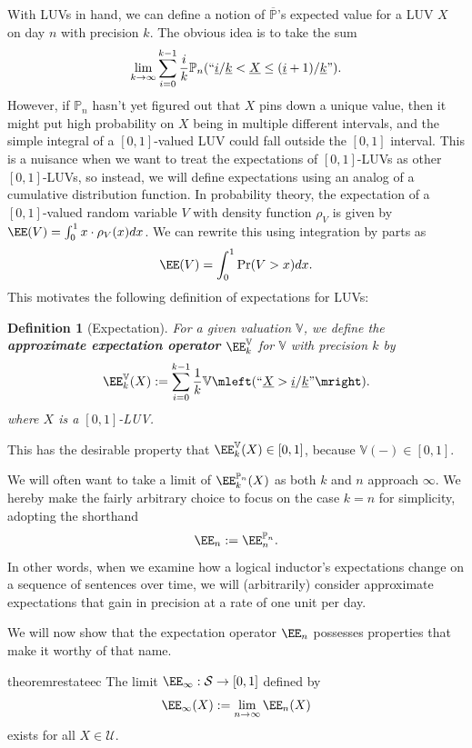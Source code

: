\documentclass[authordate,onecolumn,noenvironments]{miri-tech-article}
\newtheorem{definition}[theorem]{Definition}
\numberwithin{equation}{subsection}
\newcommand{\quot}[1]{``#1"}
\newcommand{\enc}[1]{{\underline{#1}}}
\newcommand{\seq}[1]{{\overline{#1}}}
\newcommand{\any}{-}
\newcommand{\LUVs}{\mathcal{U}}%
\newcommand{\nn}{n}
\newcommand{\rparenthetical}[1]{\hfill\upshape{{\small (#1)}}} %
\newcommand{\proofin}[1]{\rparenthetical{Proof in:~#1.}}
\newcommand{\Bayesian}{\mathrm{Pr}}
\newcommand{\BelState}{\mathbb{P}}
\newcommand{\Valuation}{\mathbb{V}}
\newcommand{\pt}{\BelState}
\newcommand{\MP}{\seq{\pt}}
\newcommand{\Sentences}{\mathcal{S}}
\begin{document}
With LUVs in hand, we can define a notion of $\MP$'s expected value for a LUV $X$ on day $\nn$ with precision $k$. The obvious idea is to take the sum
\[
  \lim_{k \to\infty} \sum_{i=0}^{k-1} \frac{i}{k} \pt_\nn\mleft(
    \quot{\enc{i}/\enc{k} < \enc{X} \le (\enc{i}+1)/\enc{k}}
  \mright).
\]
However, if $\pt_\nn$ hasn't yet figured out that $X$ pins down a unique value, then it might put high probability on $X$ being in multiple different intervals, and the simple integral of a $[0,1]$-valued LUV could fall outside the $[0,1]$ interval. This is a nuisance when we want to treat the expectations of $[0,1]$-LUVs as other $[0,1]$-LUVs, so instead, we will define expectations using an analog of a cumulative distribution function. In probability theory, the expectation of a $[0,1]$-valued random variable $V$ with density function $\rho_V$ is given by $\EE(V) =\int_0^1 x \cdot \rho_V(x) dx$. We can rewrite this using integration by parts as
\[
  \EE(V) =\int_0^1 \Bayesian(V>x)dx.
\]
This motivates the following definition of expectations for LUVs:


\begin{definition}[Expectation]\label{def:e}
  For a given valuation $\Valuation$, we define the \textbf{approximate expectation operator} $\EE_k^{\Valuation}$ for $\Valuation$ with precision $k$ by
  \[
    \EE_k^{\Valuation}(X) := \sum_{i=0}^{k-1}\frac{1}{k} \Valuation\mleft(\quot{\enc{X} > \enc{i}/\enc{k}} \mright).
  \]
  where $X$ is a $[0,1]$-LUV\@.
\end{definition}
\noindent This has the desirable property that $\EE_k^{\Valuation}(X)\in [0, 1]$, because $\Valuation(\any)\in [0, 1]$.


We will often want to take a limit of $\EE_k^{\pt_\nn}(X)$ as both $k$ and $n$ approach $\infty$. We hereby make the fairly arbitrary choice to focus on the case $k=\nn$ for simplicity, adopting the shorthand  
\[
  \EE_\nn := \EE_\nn^{\pt_\nn} .
\]
In other words, when we examine how a logical inductor's expectations change on a sequence of sentences over time, we will (arbitrarily) consider approximate expectations that gain in precision at a rate of one unit per day.

We will now show that the expectation operator $\EE_\nn$ possesses properties that make it worthy of that name.

\begin{restatable}{theorem}{restateec}\label{thm:ec}
  The limit ${\EE_\infty:\Sentences\rightarrow[0,1]}$  defined by
  \[
    \EE_\infty(X) := \lim_{\nn\rightarrow\infty} \EE_\nn(X)
  \] exists for all $X \in \LUVs$.
  \proofin{\ref{app:ec}}
\end{restatable}
\end{document}
